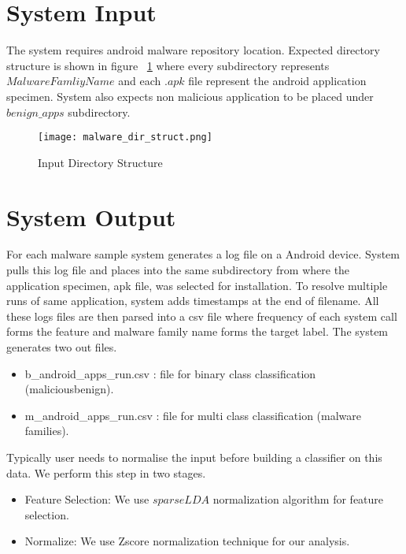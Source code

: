 
\section{System Input}
\label{System Input}
The system requires android malware repository location. Expected directory structure is shown in figure ~\ref{fig:malware_dir_struct} where every subdirectory represents \(Malware Famliy Name\) and each \(.apk\) file represent the android application specimen. System also expects non malicious application to be placed under \(benign\_apps\) subdirectory.

\begin{figure}[h]
\centering
\texttt{[image: malware\_dir\_struct.png]}
\caption{Input Directory Structure}
\label{fig:malware_dir_struct}
\end{figure}

\section{System Output}
\label{System Output}
For each malware sample system generates a log file on a Android device. System pulls this log file and places into the same subdirectory from where the application specimen, apk file, was selected for installation. To resolve multiple runs of same application, system adds timestamps at the end of filename. All these logs files are then parsed into a csv file where frequency of each system call forms the feature and malware family name forms the target label. The system generates two out files.
\begin{itemize}
\item b\_android\_apps\_run.csv : file for binary class classification (malicious\/benign).
\item m\_android\_apps\_run.csv : file for multi class classification (malware families).
\end{itemize}
Typically user needs to normalise the input before building a classifier on this data. We perform this step in two stages. 
\begin{itemize}
\item Feature Selection: We use $sparseLDA$ normalization algorithm for feature selection.
\item Normalize: We use Zscore normalization technique for our analysis.
\end{itemize}

